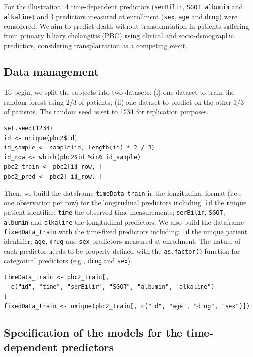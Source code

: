 For the illustration, 4 time-dependent predictors (\texttt{serBilir}, \texttt{SGOT}, \texttt{albumin} and \texttt{alkaline}) and 3 predictors measured at enrollment (\texttt{sex}, \texttt{age} and \texttt{drug}) were considered. We aim to predict death without transplantation in patients suffering from primary biliary cholangitis (PBC) using clinical and socio-demographic predictors, considering transplantation as a competing event.

\subsection{Data management}\label{data-management}

To begin, we split the subjects into two datasets: (i) one dataset to train the random forest using \(2/3\) of patients; (ii) one dataset to predict on the other \(1/3\) of patients. The random seed is set to 1234 for replication purposes.

\begin{verbatim}
set.seed(1234)
id <- unique(pbc2$id)
id_sample <- sample(id, length(id) * 2 / 3)
id_row <- which(pbc2$id %in% id_sample)
pbc2_train <- pbc2[id_row, ]
pbc2_pred <- pbc2[-id_row, ]
\end{verbatim}

Then, we build the dataframe \texttt{timeData\_train} in the longitudinal format (i.e., one observation per row) for the longitudinal predictors including: \texttt{id} the unique patient identifier; \texttt{time} the observed time measurements; \texttt{serBilir}, \texttt{SGOT}, \texttt{albumin} and \texttt{alkaline} the longitudinal predictors. We also build the dataframe \texttt{fixedData\_train} with the time-fixed predictors including: \texttt{id} the unique patient identifier; \texttt{age}, \texttt{drug} and \texttt{sex} predictors measured at enrollment. The nature of each predictor needs to be properly defined with the \texttt{as.factor()} function for categorical predictors (e.g., \texttt{drug} and \texttt{sex}).

\begin{verbatim}
timeData_train <- pbc2_train[,
  c("id", "time", "serBilir", "SGOT", "albumin", "alkaline")
]
fixedData_train <- unique(pbc2_train[, c("id", "age", "drug", "sex")])
\end{verbatim}

\subsection{Specification of the models for the time-dependent predictors}\label{specification-of-the-models-for-the-time-dependent-predictors}

